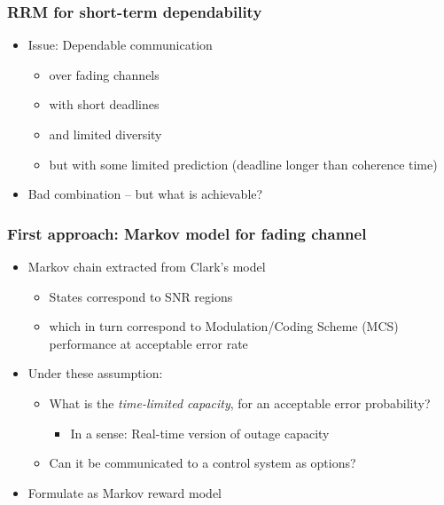 \begin{frame}
  \frametitle{RRM for short-term dependability}
  
  \begin{itemize}
  \item Issue:  Dependable communication 
    \begin{itemize}
    \item over fading channels 
    \item with short deadlines 
    \item and limited  diversity
    \item but with some limited prediction (deadline longer than
      coherence time) 
    \end{itemize}
  \item Bad combination -- but what is achievable? 
  \end{itemize}
\end{frame}

\begin{frame}
  \frametitle{First approach: Markov model for fading channel}

  \begin{itemize}
  \item Markov chain extracted from  Clark's model 
    \begin{itemize}
    \item States correspond to SNR regions
    \item which in turn correspond to
      Modulation/Coding Scheme (MCS) performance at acceptable error rate 
    \end{itemize}
  \item Under these assumption: 
    \begin{itemize}
    \item What is the \emph{time-limited capacity}, for an acceptable
      error probability?
      \begin{itemize}
      \item In a sense: Real-time version of outage capacity 
      \end{itemize}
    \item Can it be communicated to a control system as options? 
    \end{itemize}
  \item Formulate as Markov reward model 
  \end{itemize}
\end{frame}

